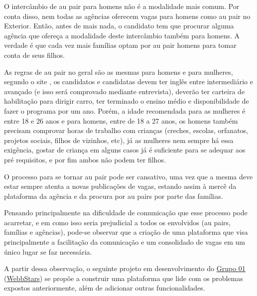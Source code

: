     \begin{citacao}
        O intercâmbio de au pair para homens não é a modalidade mais comum. Por conta disso, nem todas as agências oferecem vagas para homens como au pair no Exterior. Então, antes de mais nada, o candidato tem que procurar alguma agência que ofereça a modalidade deste intercâmbio também para homens. A verdade é que cada vez mais famílias optam por au pair homens para tomar conta de seus filhos.
        \cite{partiuIntercam2022}
    \end{citacao}
    
    As regras de au pair no geral são as mesmas para homens e para mulheres, segundo o site \cite{partiuIntercam2022}, os candidatos e candidatas devem ter inglês entre intermediário e avançado (e isso será comprovado mediante entrevista), deverão ter carteira de habilitação para dirigir carro, ter terminado o ensino médio e disponibilidade de fazer o programa por um ano. Porém, a idade recomendada para as mulheres é entre 18 e 26 anos e para homens, entre de 18 a 27 anos, os homens também precisam comprovar horas de trabalho com crianças (creches, escolas, orfanatos, projetos sociais, filhos de vizinhos, etc), já as mulheres nem sempre há essa exigência, gostar de criança em alguns casos já é suficiente para se adequar aos pré requisitos, e por fim ambos não podem ter filhos.

    O processo para se tornar au pair pode ser cansativo, uma vez que a mesma deve estar sempre atenta a novas publicações de vagas, estando assim à mercê da plataforma da agência e da procura por au pairs por parte das famílias.

    Pensando principalmente na dificuldade de comunicação que esse processo pode acarretar, e em como isso seria prejudicial a todos os envolvidos (au pairs, famílias e agências), pode-se observar que a criação de uma plataforma que visa principalmente a facilitação da comunicação e um consolidado de vagas em um único lugar se faz necessária. 

    A partir dessa observação, o seguinte projeto em desenvolvimento do \href{https://svn.spo.ifsp.edu.br/svn/a6pgp/S202202-PI-NOT/WebbStars}{Grupo 01} (\href{https://webbstarsifspgrupo1.blogspot.com/}{WebbStars}) se propõe a construir uma plataforma que lide com os problemas expostos anteriormente, além de adicionar outras funcionalidades.
